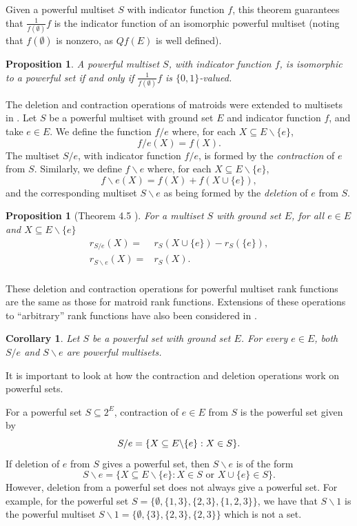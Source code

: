 \documentclass[10pt]{article}
\newtheorem{cor}[thm]{Corollary}
\newtheorem{pro}[thm]{Proposition}
\theoremstyle{definition}
\begin{document}
Given a powerful multiset $S$ with indicator function $f$, this theorem guarantees that $\frac{1}{f(\emptyset)}f$ is the indicator function of an isomorphic powerful multiset (noting that $f(\emptyset)$ is nonzero, as $Qf(E)$ is well defined).


\begin{pro}
    A powerful multiset $S$, with indicator function $f$, is isomorphic to a powerful set if and only if $\frac{1}{f(\emptyset)}f$ is $\{0,1\}$-valued. 
\end{pro}


The deletion and contraction operations of matroids were extended to multisets in \cite{farr93}. Let $S$ be a powerful multiset with ground set $E$ and indicator function $f$, and take $e\in E$. We define the function $f/ e$ where, for each $X\subseteq E\backslash\{e\}$,
\[  f/e(X)=f(X).     \]
The multiset $S/e$, with indicator function $f/e$, is formed by the \emph{contraction} of $e$ from $S$. Similarly, we define $f\backslash e$ where, for each $X\subseteq E\backslash\{e\}$,
\[  f\backslash e(X)={f(X)+f(X\cup \{e\})},\]
and the corresponding multiset $S\backslash e$ as being formed by the \emph{deletion} of $e$ from $S$.

\begin{pro}[Theorem 4.5 \cite{farr93}]\label{pro:minor_rank} For a multiset $S$ with ground set $E$, for all $e\in E$ and $X\subseteq E\backslash\{e\}$
\[\begin{array}{ll}
     r_{S/e}(X)=&r_S(X\cup\{e\})-r_S(\{e\}),  \\
     r_{S\backslash{e }} (X)=&r_S(X).    \\
\end{array}\]
\end{pro}

These deletion and contraction operations for powerful multiset rank functions are the same as those for matroid rank functions. Extensions of these operations to ``arbitrary'' rank functions have also been considered in \cite{gordon2012}. 

\begin{cor}
    Let $S$ be a powerful set with ground set $E$. For every $e\in E$, both $S/e$ and $S\backslash e$ are powerful multisets.
\end{cor}

It is important to look at how the contraction and deletion operations work on powerful sets.

For a powerful set $S\subseteq 2^E$, contraction \cite{farr2017} of $e\in E$ from $S$ is the powerful set given by 
\[      S/e=\{X\subseteq E\backslash\{e\}:X\in S\text\}.  \]
If deletion of $e$ from $S$ gives a powerful set, then $S\backslash e$ is of the form
\[  S\backslash e =\{ X\subseteq E\backslash\{e\}:X\in S \text{ or } X\cup \{e\}\in S    \}.      \]  
However, deletion from a powerful set does not always give a powerful set. For example, for the powerful set $S=\{\emptyset,\{1,3\},\{2,3\},\{1,2,3\}\}$, we have that $S\backslash 1$ is the powerful multiset $S\backslash 1 =\{\emptyset,\{3\},\{2,3\},\{2,3\}\}$ which is not a set.  
\end{document}
